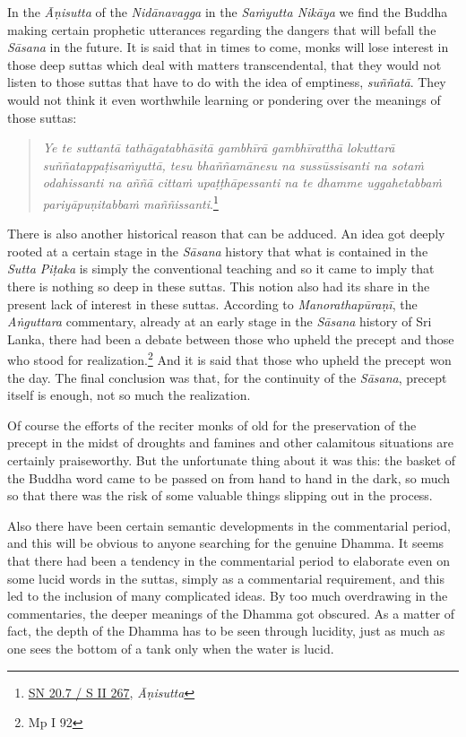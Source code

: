 In the \emph{Āṇisutta} of the \emph{Nidānavagga} in the \emph{Saṁyutta Nikāya} we find the Buddha making certain prophetic utterances regarding the dangers that will befall the \emph{Sāsana} in the future. It is said that in times to come, monks will lose interest in those deep suttas which deal with matters transcendental, that they would not listen to those suttas that have to do with the idea of emptiness, \emph{suññatā}. They would not think it even worthwhile learning or pondering over the meanings of those suttas:

\begin{quote}
\emph{Ye te suttantā tathāgatabhāsitā gambhīrā gambhīratthā lokuttarā suññatappaṭisaṁyuttā, tesu bhaññamānesu na sussūssisanti na sotaṁ odahissanti na aññā cittaṁ upaṭṭhāpessanti na te dhamme uggahetabbaṁ pariyāpuṇitabbaṁ maññissanti}.\footnote{\href{https://suttacentral.net/sn20.7/pli/ms}{SN 20.7 / S II 267}, \emph{Āṇisutta}}
\end{quote}

There is also another historical reason that can be adduced. An idea got deeply rooted at a certain stage in the \emph{Sāsana} history that what is contained in the \emph{Sutta Piṭaka} is simply the conventional teaching and so it came to imply that there is nothing so deep in these suttas. This notion also had its share in the present lack of interest in these suttas. According to \emph{Manorathapūraṇī}, the \emph{Aṅguttara} commentary, already at an early stage in the \emph{Sāsana} history of Sri Lanka, there had been a debate between those who upheld the precept and those who stood for realization.\footnote{Mp I 92} And it is said that those who upheld the precept won the day. The final conclusion was that, for the continuity of the \emph{Sāsana}, precept itself is enough, not so much the realization.

Of course the efforts of the reciter monks of old for the preservation of the precept in the midst of droughts and famines and other calamitous situations are certainly praiseworthy. But the unfortunate thing about it was this: the basket of the Buddha word came to be passed on from hand to hand in the dark, so much so that there was the risk of some valuable things slipping out in the process.

Also there have been certain semantic developments in the commentarial period, and this will be obvious to anyone searching for the genuine Dhamma. It seems that there had been a tendency in the commentarial period to elaborate even on some lucid words in the suttas, simply as a commentarial requirement, and this led to the inclusion of many complicated ideas. By too much overdrawing in the commentaries, the deeper meanings of the Dhamma got obscured. As a matter of fact, the depth of the Dhamma has to be seen through lucidity, just as much as one sees the bottom of a tank only when the water is lucid.

